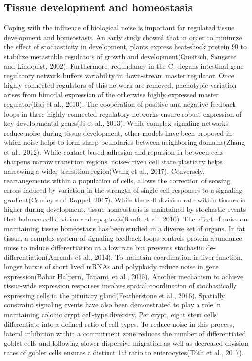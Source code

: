 \subsection{Tissue development and homeostasis}

Coping with the influence of biological noise is important for regulated tissue development and homeostasis. An early study showed that in order to minimize the effect of stochasticity in development, plants express heat-shock protein 90 to stabilize metastable regulators of growth and development(Queitsch, Sangster and Lindquist, 2002). Furthermore, redundancy in the C. elegans intestinal gene regulatory network buffers variability in down-stream master regulator. Once highly connected regulators of this network are removed, phenotypic variation arises from bimodal expression of the otherwise highly expressed master regulator(Raj et al., 2010). The cooperation of positive and negative feedback loops in these highly connected regulatory networks ensure robust expression of key developmental genes(Ji et al., 2013). While complex signaling networks reduce noise during tissue development, other models have been proposed in which noise helps to form sharp boundaries between neighboring domains(Zhang et al., 2012). While contact based adhesion and repulsion in between cells sharpens narrow transition regions, noise-driven cell state plasticity helps narrowing a wider transition region(Wang et al., 2017). Conversely, rearrangements within a population of cells, allows the correction of sensing errors induced by variation in the strength of single cell responses to a signaling gradient(Camley and Rappel, 2017).
While the cell division rate within tissues is higher during development, tissue homeostasis is maintained by stochastic events that balance cell division and apoptosis(Ranft et al., 2010). The effect of noise on maintaining tissue homeostasis has been studied in a diverse set of organs. In fat tissue, a complex system of signaling feedback loops controls protein abundance noise to induce differentiation at a low rate but prevents stochastic de-differentiation(Ahrends et al., 2014). To maintain coordination in liver function, longer bursts of short lived mRNAs and polyploidy reduce noise in gene expression(Bahar Halpern, Tanami, et al., 2015). Another mechanism to achieve tissue-wide expression responses involves spatial coordination of stochastically expressing cells in the pituitary gland(Featherstone et al., 2016). Spatially constraint signaling events have also been demonstrated to play a role in maintaining colonic crypt cell-type diversity. Per crypt, eight stem cells differentiate into a defined ratio of cell-types. To reduce noise in this process, lateral inhibition within a commitment zone reduces the number of differentiated goblet cells and following slower dispersive migration as well as decreased division rates of goblet cells ensures a distinct 1:3 ratio to enterocytes(Tóth et al., 2017).


